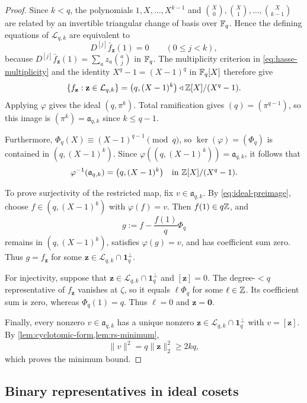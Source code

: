 \begin{proof}
 Since $k<q$, the polynomials
 $1,X,\ldots,X^{k-1}$ and
 $\binom X0,\binom X1,\ldots,\binom X{k-1}$ are related by an invertible
triangular change of basis over $\mathbb F_q$.  Hence the defining equations of
$\mathcal L_{q,k}$ are equivalent to
\[
 D^{[j]}\bar f_{\mathbf z}(1)=0
 \qquad(0\le j<k),
\]
because
$D^{[j]}\bar f_{\mathbf z}(1)=\sum_a z_a\binom aj$ in $\mathbb F_q$.
The multiplicity criterion in \cref{eq:hasse-multiplicity} and the identity
$X^q-1=(X-1)^q$ in $\mathbb F_q[X]$ therefore give
\[
 \{f_{\mathbf z}:\mathbf z\in\mathcal L_{q,k}\}
 =\bigl(q,(X-1)^k\bigr)
 \triangleleft\mathbb Z[X]/(X^q-1).
\]
Applying $\varphi$ gives the ideal $(q,\pi^k)$.  Total ramification gives
$(q)=(\pi^{q-1})$, so this image is
$(\pi^k)=\mathfrak a_{q,k}$ since $k\le q-1$.

Furthermore, $\Phi_q(X)\equiv(X-1)^{q-1}\pmod q$, so
$\ker(\varphi)=(\Phi_q)$ is contained in
$(q,(X-1)^k)$.  Since $\varphi((q,(X-1)^k))=\mathfrak a_{q,k}$, it follows that
\begin{equation}
\label{eq:ideal-preimage}
 \varphi^{-1}(\mathfrak a_{q,k})
 =\bigl(q,(X-1)^k\bigr)
 \quad\text{in }\mathbb Z[X]/(X^q-1).
\end{equation}

To prove surjectivity of the restricted map, fix
$v\in\mathfrak a_{q,k}$.  By \cref{eq:ideal-preimage}, choose
$f\in(q,(X-1)^k)$ with $\varphi(f)=v$.  Then $f(1)\in q\mathbb Z$, and
\[
 g:=f-\frac{f(1)}q\Phi_q
\]
remains in $(q,(X-1)^k)$, satisfies $\varphi(g)=v$, and has coefficient sum
zero.  Thus $g=f_{\mathbf z}$ for some
$\mathbf z\in\mathcal L_{q,k}\cap\mathbf1_q^\perp$.

For injectivity, suppose that
$\mathbf z\in\mathcal L_{q,k}\cap\mathbf1_q^\perp$ and $[\mathbf z]=0$.
The degree-$<q$ representative of $f_{\mathbf z}$ vanishes at $\zeta$, so it
equals $\ell\Phi_q$ for some $\ell\in\mathbb Z$.  Its coefficient sum is zero,
whereas $\Phi_q(1)=q$.  Thus $\ell=0$ and $\mathbf z=\mathbf0$.

Finally, every nonzero $v\in\mathfrak a_{q,k}$ has a unique nonzero
$\mathbf z\in\mathcal L_{q,k}\cap\mathbf1_q^\perp$ with $v=[\mathbf z]$.
By \cref{lem:cyclotomic-form,lem:rs-minimum},
\[
 \|v\|^2=q\|\mathbf z\|_2^2\ge2kq,
\]
which proves the minimum bound.
\end{proof}

\subsection{Binary representatives in ideal cosets}

